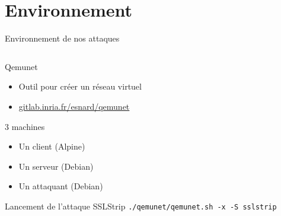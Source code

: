 \section{Environnement}


\begin{frame}[fragile]{Environnement de nos attaques}
  \begin{columns}
    \begin{column}{0.5\textwidth}
      \begin{block}{Qemunet}
        \begin{itemize}
        \item Outil pour créer un réseau virtuel
        \item \url{gitlab.inria.fr/esnard/qemunet}
        \end{itemize}
      \end{block}

      \begin{exampleblock}{3 machines}
        \begin{itemize}
        \item Un client (Alpine)
        \item Un serveur (Debian)
        \item Un attaquant (Debian)
        \end{itemize}
      \end{exampleblock}

      \begin{exampleblock}{Lancement de l'attaque SSLStrip}
        \verb+./qemunet/qemunet.sh -x -S sslstrip+

      \end{exampleblock}

    \end{column}


\end{columns}
\end{frame}
